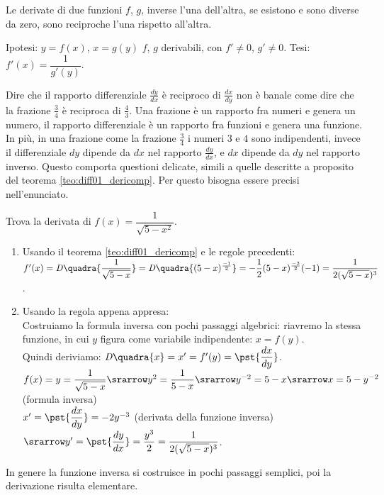\begin{teorema}
 Le derivate di due funzioni $f$, $g$, inverse l'una dell'altra, se esistono
 e sono diverse da zero, sono reciproche l'una rispetto all'altra.
\end{teorema}
\noindent Ipotesi: $y=f(x)$, $x=g(y)$ $f$, $g$ derivabili, con $f'\ne0$, 
$g'\ne 0$.
\hspace{2cm} Tesi: $f'(x)=\dfrac{1}{g'(y)}$.
\begin{osservazione}
 Dire che il rapporto differenziale $\frac{dy}{dx}$ è reciproco di 
$\frac{dx}{dy}$ 
 non è banale come dire che la frazione $\frac{3}{4}$ è reciproca di 
$\frac{4}{3}$.
 Una frazione è un rapporto fra numeri e genera un numero, il rapporto 
differenziale è un rapporto fra funzioni e genera una funzione. In più,  
in una frazione come la frazione $\frac{3}{4}$ i numeri $3$ e $4$ sono 
indipendenti, invece il differenziale $dy$ dipende da $dx$ nel rapporto
$\frac{dy}{dx}$,  e $dx$ dipende da $dy$ nel rapporto inverso. Questo comporta 
questioni delicate, simili a quelle descritte a proposito del teorema 
\ref{teo:diff01_dericomp}. Per questo bisogna essere precisi nell'enunciato.
\end{osservazione}
\begin{esempio}
  Trova la derivata di $f(x)=\dfrac{1}{\sqrt{5-x^2}}$.
  \begin{enumerate}[noitemsep]
   \item Usando il teorema \ref{teo:diff01_dericomp} e le regole 
precedenti:\\
   $f'(x)=\mathit{D}\quadra{\dfrac{1}{\sqrt{5-x}}}=
   \mathit{D}\quadra{(5-x)^\frac{-1}{2}}=-\dfrac{1}{2}(5-x)
   ^\frac{-3}{2}(-1) = \dfrac{1}{2(\sqrt{5-x})^3}$.
   \item Usando la regola appena appresa:\\
   Costruiamo la formula inversa con pochi passaggi algebrici: riavremo la 
   stessa funzione, in cui $y$ figura come variabile indipendente: 
$x=f(y)$.\\
   Quindi deriviamo: $\mathit{D}\quadra{x}=x'=f'(y)=\pst{\dfrac{dx}{dy}}$.\\
   $f(x)=y=\dfrac{1}{\sqrt{5-x}}\srarrow y^2=\dfrac{1}{5-x}\srarrow 
   y^{-2}=5-x\srarrow x=5-y^{-2}$  (formula inversa)\\
   $x'=\pst{\dfrac{dx}{dy}}=-2y^{-3}$ (derivata della funzione inversa)\\
   $\srarrow y'=\pst{\dfrac{dy}{dx}}=\dfrac{y^3}{2}=
   \dfrac{1}{2(\sqrt{5-x})^3}$.
  \end{enumerate}
In genere la funzione inversa si costruisce in pochi passaggi semplici, poi 
la derivazione risulta elementare.
\end{esempio}



